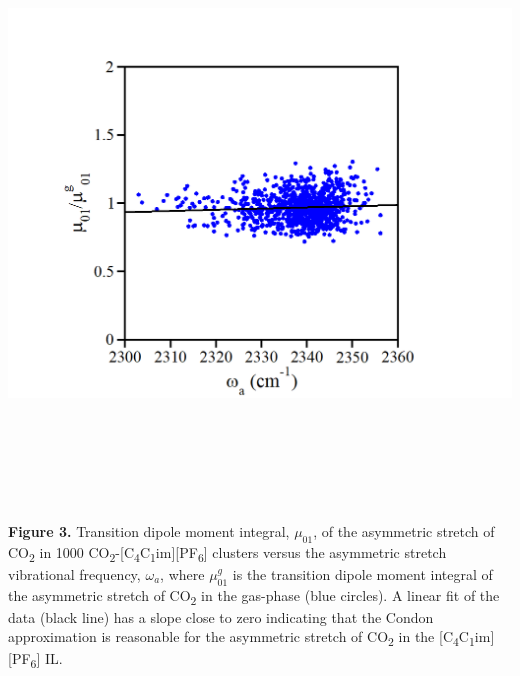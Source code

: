 \documentclass[]{article}
\begin{document}
\includegraphics[width=6.49062in,height=6.25278in]{figure3.png}

\textbf{Figure 3.} Transition dipole moment integral, \(\mu_{01}\), of
the asymmetric stretch of CO\textsubscript{2} in 1000
CO\textsubscript{2}-{[}C\textsubscript{4}C\textsubscript{1}im{]}{[}PF\textsubscript{6}{]}
clusters versus the asymmetric stretch vibrational frequency,
\(\omega_{a}\), where \(\mu_{01}^{g}\) is the transition dipole moment
integral of the asymmetric stretch of CO\textsubscript{2} in the
gas-phase (blue circles). A linear fit of the data (black line) has a
slope close to zero indicating that the Condon approximation is
reasonable for the asymmetric stretch of CO\textsubscript{2} in the
{[}C\textsubscript{4}C\textsubscript{1}im{]}{[}PF\textsubscript{6}{]}
IL.
\end{document}
